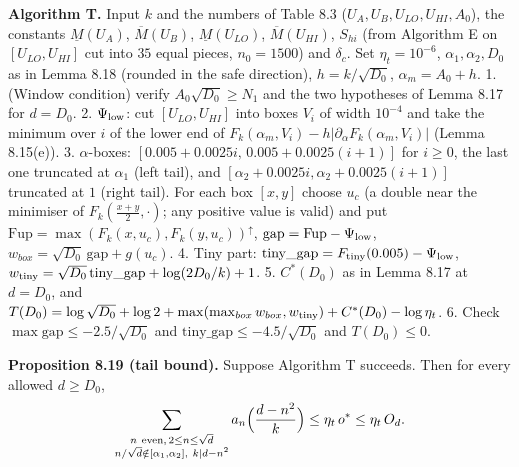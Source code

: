 \textbf{Algorithm T.} Input \(k\) and the numbers of Table 8.3 (\(U_A,U_B,U_{LO},U_{HI},A_0\)), the constants \(\underline M(U_A)\), \(\overline M(U_B)\), \(\underline M(U_{LO})\), \(\overline M(U_{HI})\), \(S_{hi}\) (from Algorithm E on \([U_{LO},U_{HI}]\) cut into \(35\) equal pieces, \(n_0=1500\)) and \(\delta_c\). Set \(\eta_t=10^{-6}\), \(\alpha_1,\alpha_2,D_0\) as in Lemma 8.18 (rounded in the safe direction), \(h=k/\sqrt{D_0}\), \(\alpha_m=A_0+h\).
1. (Window condition) verify \(A_0\sqrt{D_0}\ge N_1\) and the two hypotheses of Lemma 8.17 for \(d=D_0\).
2. \(\Psi_{\rm low}\): cut \([U_{LO},U_{HI}]\) into boxes \(V_i\) of width \(10^{-4}\) and take the minimum over \(i\) of the lower end of \(F_k(\alpha_m,V_i)-h|\partial_\alpha F_k(\alpha_m,V_i)|\) (Lemma 8.15(e)).
3. \(\alpha\)-boxes: \([0.005+0.0025i,\,0.005+0.0025(i+1)]\) for \(i\ge0\), the last one truncated at \(\alpha_1\) (left tail), and \([\alpha_2+0.0025i,\alpha_2+0.0025(i+1)]\) truncated at \(1\) (right tail). For each box \([x,y]\) choose \(u_c\) (a double near the minimiser of \(F_k(\frac{x+y}2,\cdot)\); any positive value is valid) and put \(\mathrm{Fup}=\max(F_k(x,u_c),F_k(y,u_c))^{\uparrow}\), \(\mathrm{gap}=\mathrm{Fup}-\Psi_{\rm low}\), \(w_{box}=\sqrt{D_0}\,\mathrm{gap}+g(u_c)\).
4. Tiny part: \(\mathrm{tiny\_gap}=F_{\rm tiny}(0.005)-\Psi_{\rm low}\), \(w_{\rm tiny}=\sqrt{D_0}\,\mathrm{tiny\_gap}+\log(2D_0/k)+1\).
5. \(C^*(D_0)\) as in Lemma 8.17 at \(d=D_0\), and \(T(D_0)=\log\sqrt{D_0}+\log2+\max(\max_{box}w_{box},w_{\rm tiny})+C^*(D_0)-\log\eta_t\).
6. Check \(\max\mathrm{gap}\le-2.5/\sqrt{D_0}\) and \(\mathrm{tiny\_gap}\le-4.5/\sqrt{D_0}\) and \(T(D_0)\le0\).

\textbf{Proposition 8.19 (tail bound).} Suppose Algorithm T succeeds. Then for every allowed \(d\ge D_0\),
\[\sum_{\substack{n\ \mathrm{even},\,2\le n\le\sqrt d\\ n/\sqrt d\notin[\alpha_1,\alpha_2],\ k\mid d-n^2}}a_n\Bigl(\frac{d-n^2}k\Bigr)\le\eta_t\,o^*\le\eta_t\,O_d .\]

